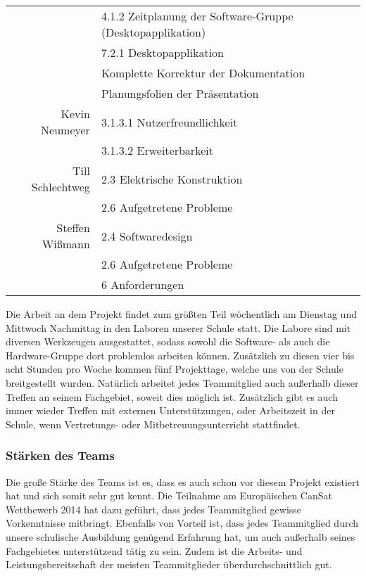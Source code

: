 \begin{table}[H]
\begin{tabular}{rl}
		 & 4.1.2 Zeitplanung der Software-Gruppe (Desktopapplikation) \\
		 & 7.2.1 Desktopapplikation \\
		 & Komplette Korrektur der Dokumentation \\
		 & Planungsfolien der Präsentation \\
		Kevin Neumeyer & 3.1.3.1 Nutzerfreundlichkeit \\
		 & 3.1.3.2 Erweiterbarkeit \\
		Till Schlechtweg & 2.3 Elektrische Konstruktion \\
		& 2.6 Aufgetretene Probleme \\
		Steffen Wißmann & 2.4 Softwaredesign \\
		& 2.6 Aufgetretene Probleme \\
		& 6 Anforderungen \\
		\bottomrule
	\end{tabular}
\end{table}

Die Arbeit an dem Projekt findet zum größten Teil wöchentlich am Dienstag und Mittwoch Nachmittag in den Laboren unserer Schule statt. Die Labore sind mit diversen Werkzeugen ausgestattet, sodass sowohl die Software- als auch die Hardware-Gruppe dort problemlos arbeiten können. Zusätzlich zu diesen vier bis acht Stunden pro Woche kommen fünf Projekttage, welche uns von der Schule breitgestellt wurden. Natürlich arbeitet jedes Teammitglied auch außerhalb dieser Treffen an seinem Fachgebiet, soweit dies möglich ist. Zusätzlich gibt es auch immer wieder Treffen mit externen Unterstützungen, oder Arbeitszeit in der Schule, wenn Vertretungs- oder Mitbetreuungsunterricht stattfindet.

\subsubsection{Stärken des Teams}
Die große Stärke des Teams ist es, dass es auch schon vor diesem Projekt existiert hat und sich somit sehr gut kennt. Die Teilnahme am Europäischen CanSat Wettbewerb 2014 hat dazu geführt, dass jedes Teammitglied gewisse Vorkenntnisse mitbringt. Ebenfalls von Vorteil ist, dass jedes Teammitglied durch unsere schulische Ausbildung genügend Erfahrung hat, um auch außerhalb seines Fachgebietes unterstützend tätig zu sein. Zudem ist die Arbeits- und Leistungsbereitschaft der meisten Teammitglieder überdurchschnittlich gut.

